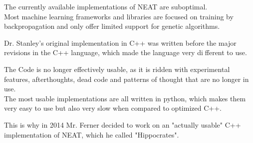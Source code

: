 The currently available implementations of NEAT are suboptimal. \\
Most machine learning frameworks and libraries are focused on training by backpropagation and only offer limited support for genetic algorithms.

Dr. Stanley's original implementation in C++ \cite{Stanley2010} was written before the major revisions in the
C++ language, which made the language very different to use.\cite{Stroustrup2013}

The Code is no longer effectively usable, as it is ridden with experimental features, afterthoughts, dead code and patterns of thought that are no longer in use. \\
The most usable implementations are all written in python, which makes them very easy to use but also very slow when compared to optimized C++.

This is why in 2014 Mr. Ferner decided to work on an "actually usable" C++ implementation of NEAT,
which he called "Hippocrates".
